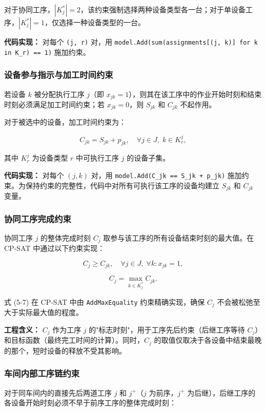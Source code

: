 \documentclass[UTF8,a4paper,12pt]{ctexart}
\begin{document}
对于协同工序，$|K_j^*| = 2$，该约束强制选择两种设备类型各一台；对于单设备工序，$|K_j^*| = 1$，仅选择一种设备类型的一台。

\textbf{代码实现：} 对每个 \texttt{(j, r)} 对，用 \texttt{model.Add(sum(assignments[(j, k)] for k in K\_r) == 1)} 施加约束。

\subsubsection{设备参与指示与加工时间约束}
若设备 $k$ 被分配执行工序 $j$（即 $x_{jk} = 1$），则其在该工序中的作业开始时刻和结束时刻必须满足加工时间约束；若 $x_{jk} = 0$，则 $S_{jk}$ 和 $C_{jk}$ 不起作用。

对于被选中的设备，加工时间约束为：

\begin{equation}
C_{jk} = S_{jk} + p_{jk}, \quad \forall j \in J, \; k \in K_r^j,
\end{equation}

其中 $K_r^j$ 为设备类型 $r$ 中可执行工序 $j$ 的设备子集。

\textbf{代码实现：} 对每个 $(j, k)$ 对，用 \texttt{model.Add(C\_jk == S\_jk + p\_jk)} 施加约束。为保持约束的完整性，代码中对所有可执行该工序的设备均建立 $S_{jk}$ 和 $C_{jk}$ 变量。

\subsubsection{协同工序完成约束}
协同工序 $j$ 的整体完成时刻 $C_j$ 取参与该工序的所有设备结束时刻的最大值。在 CP-SAT 中通过以下约束实现：

\begin{equation}
C_j \geq C_{jk}, \quad \forall j \in J, \; \forall k: x_{jk} = 1,
\end{equation}

\begin{equation}
C_j = \max_{k \in K_j^*} C_{jk}.
\end{equation}

式 (5-7) 在 CP-SAT 中由 \texttt{AddMaxEquality} 约束精确实现，确保 $C_j$ 不会被松弛至大于实际最大值的程度。

\textbf{工程含义：} $C_j$ 作为工序 $j$ 的"标志时刻"，用于工序先后约束（后继工序等待 $C_j$）和目标函数（最终完工时间的计算）。同时，$C_j$ 的取值仅取决于各设备中结束最晚的那个，短时设备的释放不受其影响。

\subsubsection{车间内部工序链约束}
对于同车间内的直接先后两道工序 $j$ 和 $j^+$（$j$ 为前序，$j^+$ 为后继），后继工序的各设备开始时刻必须不早于前序工序的整体完成时刻：
\end{document}
